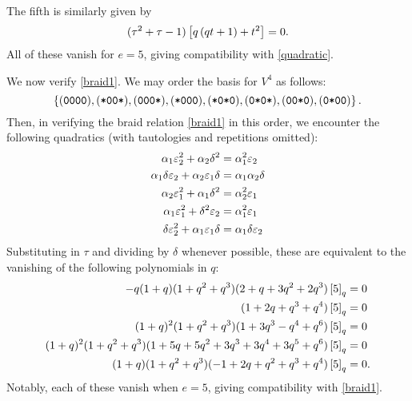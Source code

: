\documentclass{amsart}
\begin{document}
The fifth is similarly given by
\[
  (\tau^2 + \tau - 1)\left[ q\left( qt + 1 \right) + t^2 \right] = 0. 
\]
All of these vanish for $e = 5$, giving compatibility with \eqref{quadratic}.

\vspace{7pt}
We now verify \eqref{braid1}.
We may order the basis for $V^4$ as follows:
\[
  \left\{ (\texttt{0}\texttt{0}\texttt{0}\texttt{0}),(\texttt{*}\texttt{0}\texttt{0}\texttt{*}),(\texttt{0}\texttt{0}\texttt{0}\texttt{*}),(\texttt{*}\texttt{0}\texttt{0}\texttt{0}),(\texttt{*}\texttt{0}\texttt{*}\texttt{0}),(\texttt{0}\texttt{*}\texttt{0}\texttt{*}),(\texttt{0}\texttt{0}\texttt{*}\texttt{0}),(\texttt{0}\texttt{*}\texttt{0}\texttt{0}) \right\}.
\]
Then, in verifying the braid relation \eqref{braid1} in this order, we encounter the following quadratics (with tautologies and repetitions omitted):
\begin{align*}
    \alpha_1\varepsilon_2^2 + \alpha_2\delta^2 &= \alpha_1^2 \varepsilon_2\\
    \alpha_1\delta\varepsilon_2 + \alpha_2\varepsilon_1\delta &= \alpha_1\alpha_2\delta\\
    \alpha_2\varepsilon_1^2 + \alpha_1\delta^2 &= \alpha_2^2\varepsilon_1\\
    \alpha_1\varepsilon_1^2 + \delta^2\varepsilon_2 &= \alpha_1^2\varepsilon_1\\
    \delta\varepsilon_2^2 + \alpha_1\varepsilon_1\delta &= \alpha_1\delta\varepsilon_2
\end{align*}
Substituting in $\tau$ and dividing by $\delta$ whenever possible, these are equivalent to the vanishing of the following polynomials in $q$:
\begin{align*}
  -q (1 + q) (1 + q^2 + q^3) (2 + q + 3 q^2 + 2 q^3) \left[ 5 \right]_q &= 0\\
  (1 + 2 q + q^3 + q^4) \left[ 5 \right]_q &= 0\\
  (1+q)^2 (1+q^2+q^3) (1+3q^3 - q^4 + q^6)\left[ 5 \right]_q &= 0\\
  (1+q)^2 (1+q^2+q^3) (1+5q+5q^2+3q^3+3q^4+3q^5+q^6)\left[ 5 \right]_q &= 0\\
  (1+q) (1+q^2+q^3) (-1+2q+q^2+q^3+q^4)\left[ 5 \right]_q &= 0.
\end{align*}
Notably, each of these vanish when $e = 5$, giving compatibility with \eqref{braid1}.
  
\end{document}
